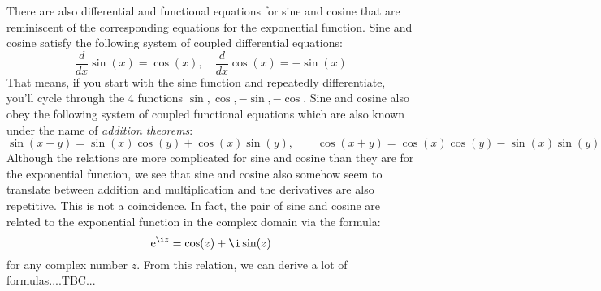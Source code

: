 There are also differential and functional equations for sine and cosine that are reminiscent of the corresponding equations for the exponential function. Sine and cosine satisfy the following system of coupled differential equations:
\begin{equation}
\frac{d}{dx} \sin(x) = \cos(x), \quad
\frac{d}{dx} \cos(x) = -\sin(x)
\end{equation}
That means, if you start with the sine function and repeatedly differentiate, you'll cycle through the 4 functions $\sin, \cos, -\sin, -\cos$. Sine and cosine also obey the following system of coupled functional equations which are also known under the name of \emph{addition theorems}:
\begin{equation}
\sin(x+y) = \sin(x) \cos(y) + \cos(x) \sin(y), \qquad
\cos(x+y) = \cos(x) \cos(y) - \sin(x) \sin(y)
\end{equation}
Although the relations are more complicated for sine and cosine than they are for the exponential function, we see that sine and cosine also somehow seem to translate between addition and multiplication and the derivatives are also repetitive. This is not a coincidence. In fact, the pair of sine and cosine are related to the exponential function in the complex domain via the formula:
\begin{equation}
\e^{\i z} = \cos(z) + \i \sin(z)
\end{equation}
for any complex number $z$. From this relation, we can derive a lot of formulas....TBC...















